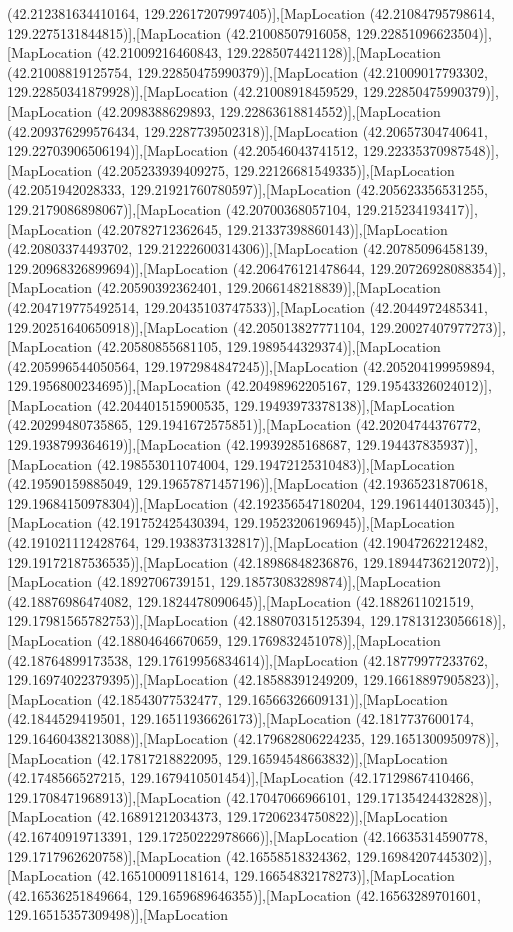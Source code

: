 (42.212381634410164, 129.22617207997405)],[MapLocation (42.21084795798614, 129.2275131844815)],[MapLocation (42.21008507916058, 129.22851096623504)],[MapLocation (42.21009216460843, 129.2285074421128)],[MapLocation (42.21008819125754, 129.22850475990379)],[MapLocation (42.21009017793302, 129.22850341879928)],[MapLocation (42.21008918459529, 129.22850475990379)],[MapLocation (42.2098388629893, 129.22863618814552)],[MapLocation (42.209376299576434, 129.2287739502318)],[MapLocation (42.20657304740641, 129.22703906506194)],[MapLocation (42.20546043741512, 129.22335370987548)],[MapLocation (42.205233939409275, 129.22126681549335)],[MapLocation (42.2051942028333, 129.21921760780597)],[MapLocation (42.205623356531255, 129.2179086898067)],[MapLocation (42.20700368057104, 129.215234193417)],[MapLocation (42.20782712362645, 129.21337398860143)],[MapLocation (42.20803374493702, 129.21222600314306)],[MapLocation (42.20785096458139, 129.20968326899694)],[MapLocation (42.206476121478644, 129.20726928088354)],[MapLocation (42.20590392362401, 129.2066148218839)],[MapLocation (42.204719775492514, 129.20435103747533)],[MapLocation (42.2044972485341, 129.20251640650918)],[MapLocation (42.205013827771104, 129.20027407977273)],[MapLocation (42.20580855681105, 129.1989544329374)],[MapLocation (42.205996544050564, 129.1972984847245)],[MapLocation (42.205204199959894, 129.1956800234695)],[MapLocation (42.20498962205167, 129.19543326024012)],[MapLocation (42.204401515900535, 129.19493973378138)],[MapLocation (42.20299480735865, 129.1941672575851)],[MapLocation (42.20204744376772, 129.1938799364619)],[MapLocation (42.19939285168687, 129.194437835937)],[MapLocation (42.198553011074004, 129.19472125310483)],[MapLocation (42.19590159885049, 129.19657871457196)],[MapLocation (42.19365231870618, 129.19684150978304)],[MapLocation (42.192356547180204, 129.1961440130345)],[MapLocation (42.191752425430394, 129.19523206196945)],[MapLocation (42.191021112428764, 129.1938373132817)],[MapLocation (42.19047262212482, 129.19172187536535)],[MapLocation (42.18986848236876, 129.18944736212072)],[MapLocation (42.1892706739151, 129.18573083289874)],[MapLocation (42.18876986474082, 129.1824478090645)],[MapLocation (42.1882611021519, 129.17981565782753)],[MapLocation (42.188070315125394, 129.17813123056618)],[MapLocation (42.18804646670659, 129.1769832451078)],[MapLocation (42.18764899173538, 129.17619956834614)],[MapLocation (42.18779977233762, 129.16974022379395)],[MapLocation (42.18588391249209, 129.16618897905823)],[MapLocation (42.18543077532477, 129.16566326609131)],[MapLocation (42.1844529419501, 129.16511936626173)],[MapLocation (42.1817737600174, 129.16460438213088)],[MapLocation (42.179682806224235, 129.1651300950978)],[MapLocation (42.17817218822095, 129.16594548663832)],[MapLocation (42.1748566527215, 129.1679410501454)],[MapLocation (42.17129867410466, 129.1708471968913)],[MapLocation (42.17047066966101, 129.17135424432828)],[MapLocation (42.16891212034373, 129.17206234750822)],[MapLocation (42.16740919713391, 129.17250222978666)],[MapLocation (42.16635314590778, 129.1717962620758)],[MapLocation (42.16558518324362, 129.16984207445302)],[MapLocation (42.165100091181614, 129.16654832178273)],[MapLocation (42.16536251849664, 129.1659689646355)],[MapLocation (42.16563289701601, 129.16515357309498)],[MapLocation 